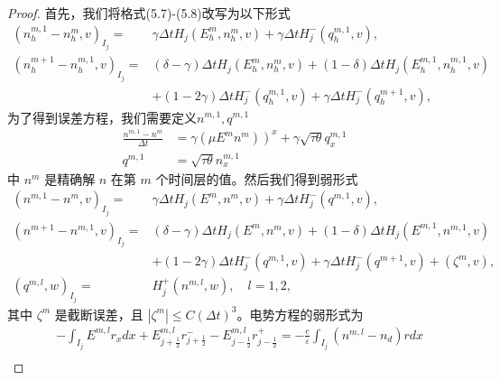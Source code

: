 \begin{proof}
    首先，我们将格式(5.7)-(5.8)改写为以下形式
    \begin{align}
        \left(n_{h}^{m, 1}-n_{h}^{m}, v\right)_{I_{j}}=   & \gamma \Delta t H_{j}\left(E_{h}^{m}, n_{h}^{m}, v\right)+\gamma \Delta t H_{j}^{-}\left(q_{h}^{m, 1}, v\right),                                 \\
        \left(n_{h}^{m+1}-n_{h}^{m, 1}, v\right)_{I_{j}}= & (\delta-\gamma) \Delta t H_{j}\left(E_{h}^{m}, n_{h}^{m}, v\right)+(1-\delta) \Delta t H_{j}\left(E_{h}^{m, 1}, n_{h}^{m, 1}, v\right) \nonumber \\
                                                          & +(1-2 \gamma) \Delta t H_{j}^{-}\left(q_{h}^{m, 1}, v\right)+\gamma \Delta t H_{j}^{-}\left(q_{h}^{m+1}, v\right),
    \end{align}
    为了得到误差方程，我们需要定义$n^{m, 1}, q^{m, 1}$
    \begin{align*}
        \frac{n^{m, 1}-n^{m}}{\Delta t} & \left.=\gamma\left(\mu E^{m} n^{m}\right)\right)^{x}+\gamma \sqrt{\tau \theta} q_{x}^{m, 1} \\
        q^{m, 1}                        & =\sqrt{\tau \theta} n_{x}^{m, 1}
    \end{align*}
    中 $n^{m}$ 是精确解 $n$ 在第 $m$ 个时间层的值。然后我们得到弱形式
    \begin{align}
        \left(n^{m, 1}-n^{m}, v\right)_{I_{j}}=   & \gamma \Delta t H_{j}\left(E^{m}, n^{m}, v\right)+\gamma \Delta t H_{j}^{-}\left(q^{m, 1}, v\right),                                           \\
        \left(n^{m+1}-n^{m, 1}, v\right)_{I_{j}}= & (\delta-\gamma) \Delta t H_{j}\left(E^{m}, n^{m}, v\right)+(1-\delta) \Delta t H_{j}\left(E^{m, 1}, n^{m, 1}, v\right)                         \\
                                                  & +(1-2 \gamma) \Delta t H_{j}^{-}\left(q^{m, 1}, v\right)+\gamma \Delta t H_{j}^{-}\left(q^{m+1}, v\right)+\left(\zeta^{m}, v\right), \nonumber \\
        \left(q^{m, l}, w\right)_{I_{j}}=         & H_{j}^{+}\left(n^{m, l}, w\right), \quad l=1,2,
    \end{align}
    其中 $\zeta^{m}$ 是截断误差，且 $\left|\zeta^{m}\right| \leq C(\Delta t)^{3}$。电势方程的弱形式为
    \begin{align}
         & -\int_{I_{j}} E^{m, l} r_{x} d x+E_{j+\frac{1}{2}}^{m, l} r_{j+\frac{1}{2}}^{-}-E_{j-\frac{1}{2}}^{m, l} r_{j-\frac{1}{2}}^{+}=-\frac{e}{\varepsilon} \int_{I_{j}}\left(n^{m, l}-n_{d}\right) r d x \\

\end{align}
\end{proof}
